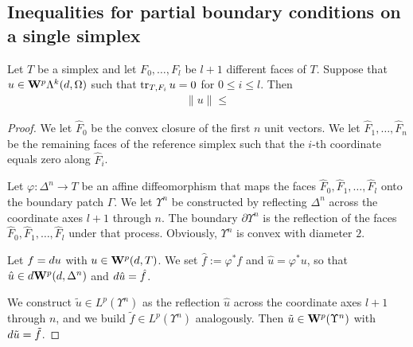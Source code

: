 \documentclass[12pt,a4paper]{article}
\begin{document}
\subsection{Inequalities for partial boundary conditions on a single simplex}


\begin{lemma}
    Let $T$ be a simplex and let $F_{0},\dots,F_{l}$ be $l+1$ different faces of $T$. 
    Suppose that $u \in {\mathbf W}^{p}\Lambda^{k}(d,\Omega)$ such that 
    $\operatorname{tr}_{T,F_i} u = 0$ for $0 \leq i \leq l$.
    Then 
    \begin{align*}
        \| u \| \leq 
    \end{align*}
\end{lemma}
\begin{proof}
    We let $\hat F_0$ be the convex closure of the first $n$ unit vectors. 
    We let $\hat F_1, \dots, \hat F_n$ be the remaining faces of the reference simplex 
    such that the $i$-th coordinate equals zero along $\hat F_i$.

    Let $\varphi : \Delta^{n} \rightarrow T$ be an affine diffeomorphism 
    that maps the faces $\hat F_{0}, \hat F_{1}, \dots, \hat F_{l}$ onto the boundary patch $\Gamma$. 
    We let $\Upsilon^{n}$ be constructed by reflecting $\Delta^{n}$ across the coordinate axes $l+1$ through $n$.
    The boundary $\partial\Upsilon^{n}$ is the reflection of the faces $\hat F_{0}, \hat F_{1}, \dots, \hat F_{l}$ under that process. 
    Obviously, $\Upsilon^{n}$ is convex with diameter $2$. 


    Let $f = d u$ with $u \in {\mathbf W}^{p}(d,T)$.
    We set $\hat f := \varphi^{\ast} f$ and $\hat u = \varphi^{\ast} u$, 
    so that $\hat u \in d {\mathbf W}^{p}(d,\Delta^{n})$ and $d \hat u = \hat f$.

    We construct $\tilde u \in L^{p}(\Upsilon^{n})$ as the reflection $\hat u$ across the coordinate axes $l+1$ through $n$, and we build $\tilde f \in L^{p}(\Upsilon^{n})$ analogously.
    Then $\tilde u \in {\mathbf W}^{p}(\Upsilon^{n})$ with $d \tilde u = \tilde f$. 


\end{proof}
\end{document}

